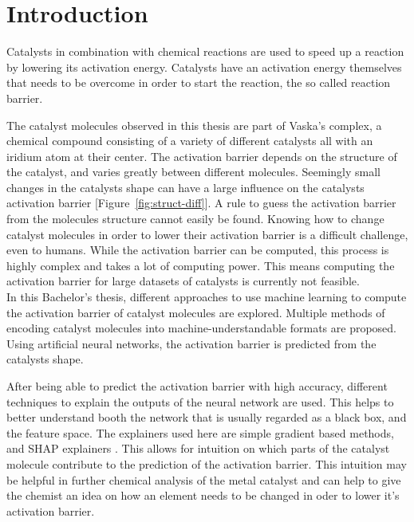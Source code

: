 
\chapter{Introduction}
\label{ch:Introduction}


Catalysts in combination with chemical reactions are used to speed up a reaction by lowering its activation energy. 
Catalysts have an activation energy themselves that needs to be overcome in order to start the reaction, the so called reaction barrier.

The catalyst molecules observed in this thesis are part of Vaska's complex, a chemical compound consisting of a variety of different catalysts all with an iridium atom at their center.
The activation barrier depends on the structure of the catalyst, and varies greatly between different molecules.
Seemingly small changes in the catalysts shape can have a large influence on the catalysts activation barrier [Figure~\ref{fig:struct-diff}].
A rule to guess the activation barrier from the molecules structure cannot easily be found.  
Knowing how to change catalyst molecules in order to lower their activation barrier is a difficult challenge, even to humans.
While the activation barrier can be computed, this process is highly complex and takes a lot of computing power.
This means computing the activation barrier for large datasets of catalysts is currently not feasible.
\\
In this Bachelor's thesis, different approaches to use machine learning to compute the activation barrier of catalyst molecules are explored.
Multiple methods of encoding catalyst molecules into machine-understandable formats are proposed.
Using artificial neural networks, the activation barrier is predicted from the catalysts shape.

After being able to predict the activation barrier with high accuracy, different techniques to explain the 
outputs of the neural network are used.
This helps to better understand booth the network that is usually regarded as a black box, and the feature space.
The explainers used here are simple gradient based methods, and SHAP explainers \cite{NIPS2017_7062}.
This allows for intuition on which parts of the catalyst molecule contribute to the prediction of the activation barrier.
This intuition may be helpful in further chemical analysis of the metal catalyst and can help to give the 
chemist an idea on how an element needs to be changed in oder to lower it's activation barrier.
\\

